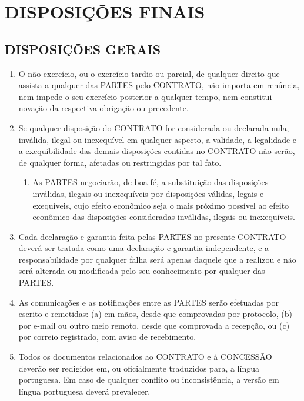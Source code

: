 \documentclass[a4paper,11pt]{report} %
\begin{document}
\chapter{DISPOSIÇÕES FINAIS}
\section{DISPOSIÇÕES GERAIS}
\label{sec:QFKF}

\begin{enumerate}
\item \label{itm:DGT8} O não exercício, ou o exercício tardio ou parcial, de qualquer direito que assista a qualquer das PARTES pelo CONTRATO, não importa em renúncia, nem impede o seu exercício posterior a qualquer tempo, nem constitui novação da respectiva obrigação ou precedente.

\item \label{itm:87VP}Se qualquer disposição do CONTRATO for considerada ou declarada nula, inválida, ilegal ou inexequível em qualquer aspecto, a validade, a legalidade e a exequibilidade das demais disposições contidas no CONTRATO não serão, de qualquer forma, afetadas ou restringidas por tal fato.

\begin{enumerate}[label*=\arabic*.]
\item \label{itm:WUZS} As PARTES negociarão, de boa-fé, a substituição das disposições inválidas, ilegais ou inexequíveis por disposições válidas, legais e exequíveis, cujo efeito econômico seja o mais próximo possível ao efeito econômico das disposições consideradas inválidas, ilegais ou inexequíveis.
\end{enumerate}

\item \label{itm:A59K} Cada declaração e garantia feita pelas PARTES no presente CONTRATO deverá ser tratada como uma declaração e garantia independente, e a responsabilidade por qualquer falha será apenas daquele que a realizou e não será alterada ou modificada pelo seu conhecimento por qualquer das PARTES.

\item \label{itm:242F} As comunicações e as notificações entre as PARTES serão efetuadas por escrito e remetidas: (a) em mãos, desde que comprovadas por protocolo, (b) por e-mail ou outro meio remoto, desde que comprovada a recepção, ou (c) por correio registrado, com aviso de recebimento.

\item \label{itm:SX6J} Todos os documentos relacionados ao CONTRATO e à CONCESSÃO deverão ser redigidos em, ou oficialmente traduzidos para, a língua portuguesa. Em caso de qualquer conflito ou inconsistência, a versão em língua portuguesa deverá prevalecer.


\end{enumerate}
\end{document}
